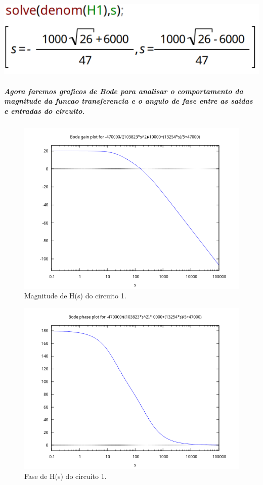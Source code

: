 \documentclass[12pt,twoside, a4paper, twocolumn]{article}
\begin{document}
\subparagraph*{}

\begin{adjustbox}{scale=0.5}
    \includegraphics{H1denom.png}
\end{adjustbox}




\subparagraph*{Agora faremos graficos de Bode para analisar o comportamento da magnitude da funcao transferencia e o angulo de fase entre as saidas e entradas do circuito.}

\subparagraph*{}

\begin{figure}[h]
    \centering
    \includegraphics[width=1\columnwidth]{images/H1bodegain.png}
    \caption{Magnitude de H(s) do circuito 1.}
\end{figure}

\begin{figure}[h]
    \centering
    \includegraphics[width=1\columnwidth]{images/H1bodephase.png}
    \caption{Fase de H(s) do circuito 1.}
\end{figure}
\end{document}
